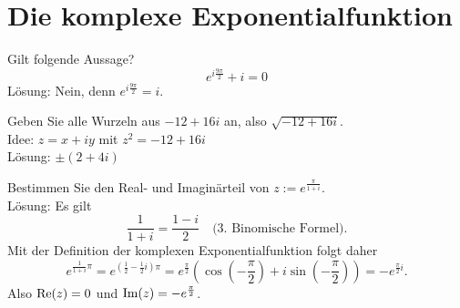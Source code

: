 \section{Die komplexe Exponentialfunktion}
Gilt folgende Aussage?
\begin{displaymath}
  e^{i \frac{9\pi}{2}} + i = 0
\end{displaymath}
Lösung: Nein, denn $e^{i \frac{9\pi}{2}} = i$.

Geben Sie alle Wurzeln aus $-12 + 16i$ an, also $\sqrt{-12 + 16i}$.\\
Idee: $z = x+iy$ mit $z^2 = -12 + 16i$\\
Lösung: $\pm (2 + 4i)$

Bestimmen Sie den Real- und Imaginärteil von $z := e^{\frac{\pi}{1 + i}}$.\\
Lösung: Es gilt
\begin{displaymath}
  \frac{1}{1 + i} = \frac{1 - i}{2} \quad \text{(3. Binomische Formel)}.
\end{displaymath}
Mit der Definition der komplexen Exponentialfunktion folgt daher
\begin{displaymath}
  e^{\frac{1}{1 + i} \pi} = e^{\left(\frac{1}{2} - \frac{1}{2}i\right)\pi} = e^{\frac{\pi}{2}}\left(\cos\left(-\frac{\pi}{2}\right) + i \sin\left(-\frac{\pi}{2}\right)\right) = -e^{\frac{\pi}{2} i}.
\end{displaymath}
Also $\operatorname{Re}(z) = 0$ und $\operatorname{Im}(z) = -e^{\frac{\pi}{2}}$.
